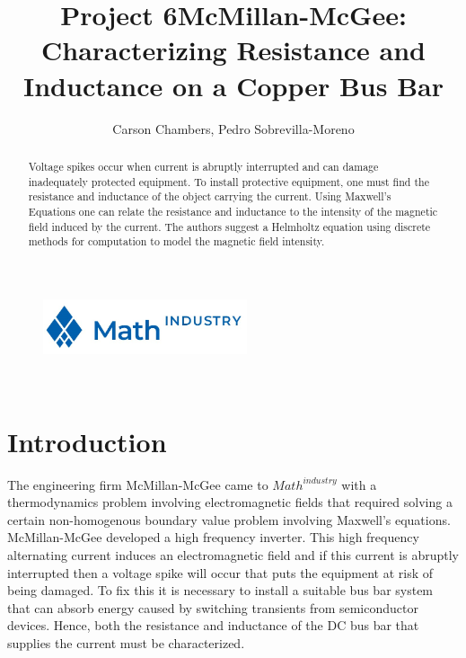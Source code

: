 \documentclass[11pt]{article}
\title{Project 6}
\begin{document}
    
     \begin{figure}[t]
    	\includegraphics[width=6cm]{m2pi.png}
    \end{figure}
    \title{McMillan-McGee:\\Characterizing Resistance and Inductance on a Copper Bus Bar}
    \author{Carson Chambers, Pedro Sobrevilla-Moreno}
    \date{}
    \maketitle
    

    
    \strut \\




\begin{abstract}
 Voltage spikes occur when current is abruptly interrupted and
can damage inadequately protected equipment. To install protective
equipment, one must find the resistance and inductance of the object
carrying the current. Using Maxwell's Equations one can relate the
resistance and inductance to the intensity of the magnetic field induced
by the current. The authors suggest a Helmholtz equation using discrete
methods for computation to model the magnetic field intensity.
\end{abstract}

\section{Introduction}

The engineering firm McMillan-McGee came to $Math^{industry}$ with a
thermodynamics problem involving electromagnetic fields that required
solving a certain non-homogenous boundary value problem involving
Maxwell's equations. McMillan-McGee developed a high frequency inverter.
This high frequency alternating current induces an electromagnetic field
and if this current is abruptly interrupted then a voltage spike will
occur that puts the equipment at risk of being damaged. To fix this it is necessary to install a
suitable bus bar system that can absorb energy caused by switching
transients from semiconductor devices. Hence, both the resistance and
inductance of the DC bus bar that supplies the current must be
characterized.
\end{document}
